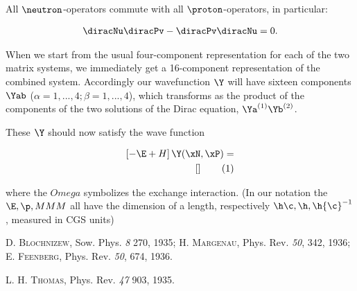 \documentclass{article}
\newcommand{\nequ}[2]{
\begin{align*}
#1
\tag{#2}
\end{align*}
}
\newcommand{\uequ}[1]{
\begin{align*}
#1
\end{align*}
}
\newcommand{\var}[1]{#1}
\newcommand{\opinv}[1]{{#1}^{-1}}
\renewcommand{\sc}[1]{\textsc{#1}}
\renewcommand{\H}{\var{H}}
\begin{document}
All $\neutron$-operators commute with all $\proton$-operators, in particular:
\uequ{
\diracNu\diracPv - \diracPv\diracNu = 0.
}

When we start from the usual four-component representation for each of the two matrix systems, we immediately get a 16-component representation of the combined system. Accordingly our wavefunction $\Y$ will have sixteen components $\Yab$ ($\alpha=1,...,4;\beta=1,...,4$), which transforms as the product of the components of the two solutions of the Dirac equation, $\Ya^{(1)}\Yb^{(2)}$.

These $\Y$ should now satisfy the wave function
\nequ{
\left[-\E + \H\right]\Y(\xN, \xP) = \\
\left[\right]
}{1}

where the $Omega$ symbolizes the exchange interaction. (In our notation the $\E, \p, MMM$ all have the dimension of a length, respectively $\h\c, \h, \h\opinv{\c}$, measured in CGS units)

\begin{thebibliography}{9}

  \sc{D. Blochnizew}, Sow. Phys. \emph{8} 270, 1935; \sc{H. Margenau}, Phys. Rev. \emph{50},  342, 1936; \sc{E. Feenberg}, Phys. Rev. \emph{50}, 674, 1936.
  
  \sc{L. H. Thomas}, Phys. Rev. \emph{47} 903, 1935.

\end{thebibliography}
\end{document}
